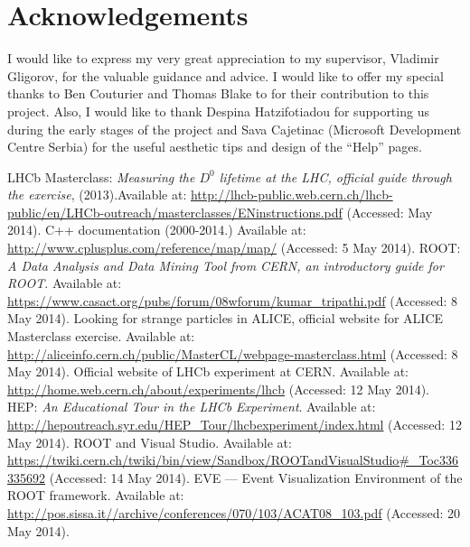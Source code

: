 \documentclass[3p,times,twocolumn]{elsarticle}
\begin{document}
\section*{Acknowledgements}
I would like to express my very great appreciation to my supervisor, Vladimir Gligorov, for the valuable guidance and advice. I would like to offer my special thanks to Ben Couturier and Thomas Blake to for their contribution to this project.  Also, I would like to thank Despina Hatzifotiadou for supporting us during the early stages of the project and Sava Cajetinac (Microsoft Development Centre Serbia) for the useful aesthetic tips and design of the ``Help'' pages.


\nocite{*}

%
\begin{thebibliography}{8}
	 LHCb Masterclass: \emph{Measuring the $D^0$ lifetime at the LHC, official guide through the exercise}, (2013).Available at: \url{http://lhcb-public.web.cern.ch/lhcb-public/en/LHCb-outreach/masterclasses/ENinstructions.pdf} (Accessed: May 2014).
	 C++ documentation (2000-2014.) Available at: \url{http://www.cplusplus.com/reference/map/map/} (Accessed: 5 May 2014).
	 ROOT: \emph{A Data Analysis and Data Mining Tool from CERN, an introductory guide for ROOT}. Available at: \url{https://www.casact.org/pubs/forum/08wforum/kumar_tripathi.pdf} (Accessed: 8 May 2014).
	 Looking for strange particles in ALICE, official website for ALICE Masterclass exercise. Available at: \url{http://aliceinfo.cern.ch/public/MasterCL/webpage-masterclass.html}  (Accessed: 8 May 2014).
	 Official website of LHCb experiment at CERN. Available at: \url{http://home.web.cern.ch/about/experiments/lhcb} (Accessed: 12 May 2014).
	 HEP: \emph{An Educational Tour in the LHCb Experiment}. Available at: \url{http://hepoutreach.syr.edu/HEP_Tour/lhcbexperiment/index.html} (Accessed: 12 May 2014).
	 ROOT and Visual Studio. Available at: \url{https://twiki.cern.ch/twiki/bin/view/Sandbox/ROOTandVisualStudio#_Toc336335692} (Accessed: 14 May 2014).
	 EVE --- Event Visualization Environment of the ROOT framework. Available at: \url{http://pos.sissa.it//archive/conferences/070/103/ACAT08_103.pdf} (Accessed: 20 May 2014).
\end{thebibliography}






\end{document}
